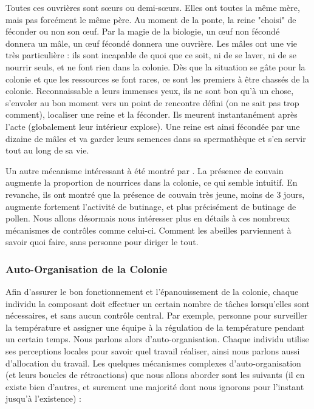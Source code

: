 			Toutes ces ouvrières sont sœurs ou demi-sœurs. Elles ont toutes la même mère, mais pas forcément le même père. Au moment de la ponte, la reine "choisi" de féconder ou non son œuf. Par la magie de la biologie, un œuf non fécondé donnera un mâle, un œuf fécondé donnera une ouvrière. Les mâles ont une vie très particulière : ils sont incapable de quoi que ce soit, ni de se laver, ni de se nourrir seuls, et ne font rien dans la colonie. Dès que la situation se gâte pour la colonie et que les ressources se font rares, ce sont les premiers à être chassés de la colonie. Reconnaissable a leurs immenses yeux, ils ne sont bon qu'à un chose, s'envoler au bon moment vers un point de rencontre défini (on ne sait pas trop comment), localiser une reine et la féconder. Ils meurent instantanément après l'acte (globalement leur intérieur explose). Une reine est ainsi fécondée par une dizaine de mâles et va garder leurs semences dans sa spermathèque et s'en servir tout au long de sa vie.
			
			Un autre mécanisme intéressant à été montré par \cite{maisonnasse_e-b-ocimene_2010}. La présence de couvain augmente la proportion de nourrices dans la colonie, ce qui semble intuitif. En revanche, ils ont montré que la présence de couvain très jeune, moins de 3 jours, augmente fortement l'activité de butinage, et plus précisément de butinage de pollen. Nous allons désormais nous intéresser plus en détails à ces nombreux mécanismes de contrôles comme celui-ci. Comment les abeilles parviennent à savoir quoi faire, sans personne pour diriger le tout.
			
		\subsubsection{Auto-Organisation de la Colonie}
			Afin d'assurer le bon fonctionnement et l'épanouissement de la colonie, chaque individu la composant doit effectuer un certain nombre de tâches lorsqu'elles sont nécessaires, et sans aucun contrôle central. Par exemple, personne pour surveiller la température et assigner une équipe à la régulation de la température pendant un certain temps. Nous parlons alors d'auto-organisation. Chaque individu utilise ses perceptions locales pour savoir quel travail réaliser, ainsi nous parlons aussi d'allocation du travail. Les quelques mécanismes complexes d'auto-organisation (et leurs boucles de rétroactions) que nous allons aborder sont les suivants (il en existe bien d'autres, et surement une majorité dont nous ignorons pour l'instant jusqu'à l'existence) :
			
